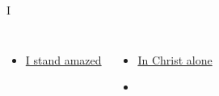 \documentclass{beamer}
\begin{document}
\begin{frame}[t]{I}
\begin{columns}[t]
        \begin{itemize}
    \item \hyperlink{I stand amazed['How marvelous']}{I stand amazed } \phantom{ 1 1 1 1 1 1 1 1 1 1}
\end{itemize}
        \begin{itemize}
            \item \hyperlink{In Christ alone[]}{In Christ alone } \phantom{ 1 1 1 1 1 1 1 1 1 1}
    \item[] \phantom{1}\end{itemize}


\end{columns}

\end{frame}
\end{document}
